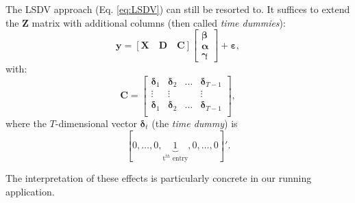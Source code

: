 \documentclass[
  11pt,
]{book}
\theoremstyle{definition}
\theoremstyle{definition}
\theoremstyle{definition}
\theoremstyle{definition}
\theoremstyle{remark}
\begin{document}
The LSDV approach (Eq. \eqref{eq:LSDV}) can still be resorted to. It suffices to extend the \(\mathbf{Z}\) matrix with additional columns (then called \emph{time dummies}):
\begin{equation}
\mathbf{y} = [\mathbf{X} \quad \mathbf{D} \quad \mathbf{C}]
\left[
\begin{array}{c}
\boldsymbol\beta\\
\boldsymbol\alpha\\
\boldsymbol\gamma
\end{array}
\right]
+ \boldsymbol\varepsilon, \label{eq:LSDV2}
\end{equation}
with:
\[
\mathbf{C} = \left[\begin{array}{cccc}
\boldsymbol{\delta}_1&\boldsymbol{\delta}_2&\dots&\boldsymbol{\delta}_{T-1}\\
\vdots&\vdots&&\vdots\\
\boldsymbol{\delta}_1&\boldsymbol{\delta}_2&\dots&\boldsymbol{\delta}_{T-1}\\
\end{array}\right],
\]
where the \(T\)-dimensional vector \(\boldsymbol\delta_t\) (the \emph{time dummy}) is
\[
[0,\dots,0,\underbrace{1}_{\mbox{t$^{th}$ entry}},0,\dots,0]'.
\]

The interpretation of these effects is particularly concrete in our running application.
\end{document}
